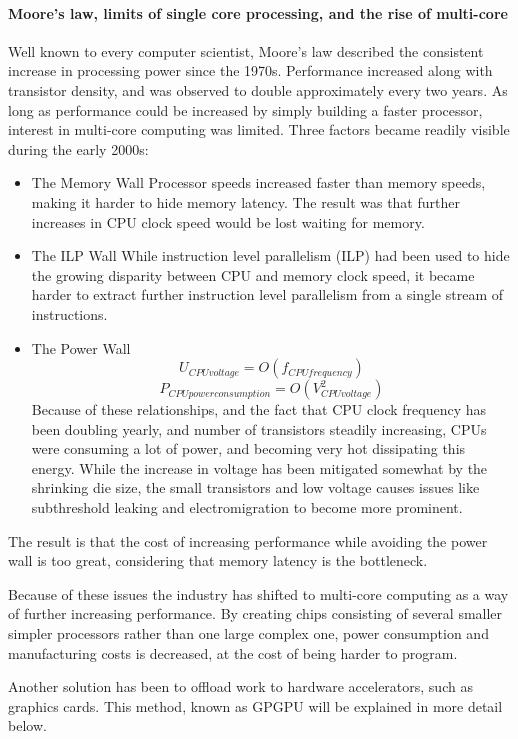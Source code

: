 \paragraph{Moore's law, limits of single core processing, and the rise of multi-core}
Well known to every computer scientist, Moore's law described the consistent increase in processing power since the
1970s. Performance increased along with transistor density, and was observed to double approximately every two years.
As long as performance could be increased by simply building a faster processor, interest in multi-core computing was
limited.
Three factors became readily visible during the early 2000s:
\begin{itemize}
	\item{The Memory Wall}
	Processor speeds increased faster than memory speeds, making it harder to hide memory latency. The result was that
	further increases in CPU clock speed would be lost waiting for memory.
	\item{The ILP Wall}
	While instruction level parallelism (ILP) had been used to hide the growing disparity between CPU and memory clock
	speed, it became harder to extract further instruction level parallelism from a single stream of instructions.
	\item{The Power Wall}
	$$U_{CPU voltage} = O(f_{CPU frequency})$$
	$$P_{CPU power consumption} = O(V^2_{CPU voltage})$$
	Because of these relationships, and the fact that CPU clock frequency has been doubling yearly, and number of
	transistors steadily increasing, CPUs were consuming a lot of power, and becoming very hot dissipating this energy.
	While the increase in voltage has been mitigated somewhat by the shrinking die size, the small transistors and low
	voltage causes issues like subthreshold leaking and electromigration to become more prominent. 
\end{itemize}
The result is that the cost of increasing performance while avoiding the power wall is too great, considering that
memory latency is the bottleneck.

Because of these issues the industry has shifted to multi-core computing as a way of further increasing performance. By
creating chips consisting of several smaller simpler processors rather than one large complex one, power consumption
and manufacturing costs is decreased, at the cost of being harder to program.

Another solution has been to offload work to hardware accelerators, such as graphics cards. This method, known as GPGPU
will be explained in more detail below.

